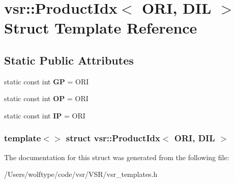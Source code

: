 \hypertarget{structvsr_1_1_product_idx_3_01_o_r_i_00_01_d_i_l_01_4}{\section{vsr\-:\-:Product\-Idx$<$ O\-R\-I, D\-I\-L $>$ Struct Template Reference}
\label{structvsr_1_1_product_idx_3_01_o_r_i_00_01_d_i_l_01_4}
}
\subsection*{Static Public Attributes}
\begin{DoxyCompactItemize}
\item 
\hypertarget{structvsr_1_1_product_idx_3_01_o_r_i_00_01_d_i_l_01_4_a277aeba170dbddf67f7ef6a850913b7b}{static const int {\bfseries G\-P} = O\-R\-I}\label{structvsr_1_1_product_idx_3_01_o_r_i_00_01_d_i_l_01_4_a277aeba170dbddf67f7ef6a850913b7b}

\item 
\hypertarget{structvsr_1_1_product_idx_3_01_o_r_i_00_01_d_i_l_01_4_a9c66b5f9b96928a07708e8a8764a83b2}{static const int {\bfseries O\-P} = O\-R\-I}\label{structvsr_1_1_product_idx_3_01_o_r_i_00_01_d_i_l_01_4_a9c66b5f9b96928a07708e8a8764a83b2}

\item 
\hypertarget{structvsr_1_1_product_idx_3_01_o_r_i_00_01_d_i_l_01_4_afd2a3e1e10a87735d648866900f70852}{static const int {\bfseries I\-P} = O\-R\-I}\label{structvsr_1_1_product_idx_3_01_o_r_i_00_01_d_i_l_01_4_afd2a3e1e10a87735d648866900f70852}

\end{DoxyCompactItemize}
\subsubsection*{template$<$$>$ struct vsr\-::\-Product\-Idx$<$ O\-R\-I, D\-I\-L $>$}



The documentation for this struct was generated from the following file\-:\begin{DoxyCompactItemize}
\item 
/\-Users/wolftype/code/vsr/\-V\-S\-R/vsr\-\_\-templates.\-h\end{DoxyCompactItemize}
